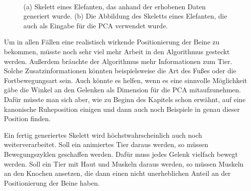 \begin{figure}
 ~
 
 \caption{(a) Skelett eines Elefanten, das anhand der erhobenen Daten generiert wurde. (b) Die Abbildung des Skeletts eines Elefanten, die auch als Eingabe für die PCA verwendet wurde.}
 \label{elefant}
\end{figure}


Um in allen Fällen eine realistisch wirkende Positionierung der Beine zu bekommen, müsste noch sehr viel mehr Arbeit in den Algorithmus gesteckt werden. Außerdem bräuchte der Algorithmus mehr Informationen zum Tier. Solche Zusatzinformationen könnten beispielsweise die Art des Fußes oder die Fortbewegungsart sein. Auch könnte es helfen, wenn es eine sinnvolle Möglichkeit gäbe die Winkel an den Gelenken als Dimension für die PCA mitaufzunehmen. Dafür müsste man sich aber, wie zu Beginn des Kapitels schon erwähnt, auf eine kanonische Ruheposition einigen und dann auch noch Beispiele in genau dieser Position finden.

Ein fertig generiertes Skelett wird höchstwahrscheinlich auch noch weiterverarbeitet. Soll \zb ein animiertes Tier daraus werden, so müssen Bewegungszyklen geschaffen werden. Dafür muss jedes Gelenk vielfach bewegt werden. Soll ein Tier mit Haut und Muskeln daraus werden, so müssen Muskeln an den Knochen ansetzen, die dann einen nicht unerheblichen Anteil an der Positionierung der Beine haben.

